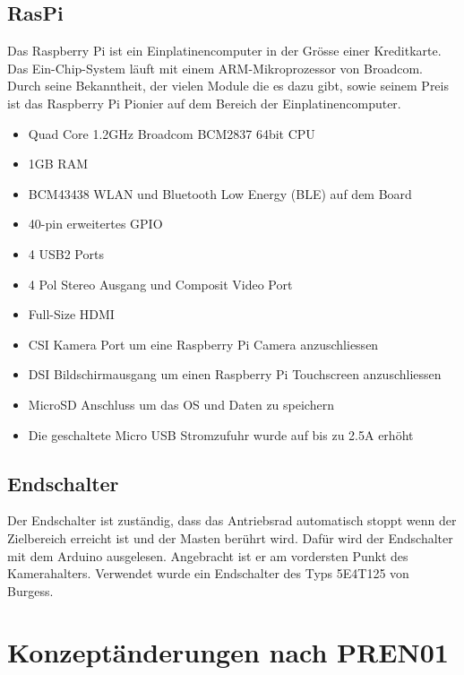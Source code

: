\documentclass[a4paper]{report}
\begin{document}
\subsection{RasPi}
Das Raspberry Pi ist ein Einplatinencomputer in der Grösse einer Kreditkarte. Das Ein-Chip-System läuft mit einem ARM-Mikroprozessor von Broadcom. Durch seine Bekanntheit, der vielen Module die es dazu gibt, sowie seinem Preis ist das Raspberry Pi Pionier auf dem Bereich der Einplatinencomputer.

\begin{itemize}[noitemsep]
	\item Quad Core 1.2GHz Broadcom BCM2837 64bit CPU
	\item 1GB RAM
	\item BCM43438 WLAN und Bluetooth Low Energy (BLE) auf dem Board
	\item 40-pin erweitertes GPIO
	\item 4 USB2 Ports
	\item 4 Pol Stereo Ausgang und Composit Video Port
	\item Full-Size HDMI
	\item CSI Kamera Port um eine Raspberry Pi Camera anzuschliessen
	\item DSI Bildschirmausgang um einen Raspberry Pi Touchscreen anzuschliessen
	\item MicroSD Anschluss um das OS und Daten zu speichern
	\item Die geschaltete Micro USB Stromzufuhr wurde auf bis zu 2.5A erhöht
\end{itemize}\parencite{RaspberryPiFoundation2017}

\vspace{1em}

\subsection{Endschalter}
Der Endschalter ist zuständig, dass das Antriebsrad automatisch stoppt wenn der Zielbereich erreicht ist und der Masten berührt wird. Dafür wird der Endschalter mit dem Arduino ausgelesen. Angebracht ist er am vordersten Punkt des Kamerahalters. Verwendet wurde ein Endschalter des Typs 5E4T125 von Burgess. 

\section{Konzeptänderungen nach PREN01}%
\label{sec:Konzeptaenderungen}
\end{document}
